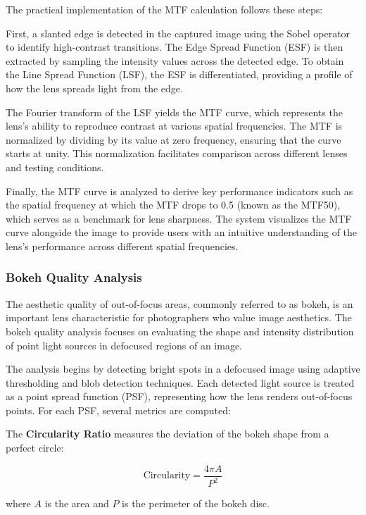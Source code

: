 The practical implementation of the MTF calculation follows these steps:

First, a slanted edge is detected in the captured image using the Sobel operator to identify high-contrast transitions. The Edge Spread Function (ESF) is then extracted by sampling the intensity values across the detected edge. To obtain the Line Spread Function (LSF), the ESF is differentiated, providing a profile of how the lens spreads light from the edge.

The Fourier transform of the LSF yields the MTF curve, which represents the lens's ability to reproduce contrast at various spatial frequencies. The MTF is normalized by dividing by its value at zero frequency, ensuring that the curve starts at unity. This normalization facilitates comparison across different lenses and testing conditions.

Finally, the MTF curve is analyzed to derive key performance indicators such as the spatial frequency at which the MTF drops to 0.5 (known as the MTF50), which serves as a benchmark for lens sharpness. The system visualizes the MTF curve alongside the image to provide users with an intuitive understanding of the lens's performance across different spatial frequencies.

\subsubsection{Bokeh Quality Analysis}
The aesthetic quality of out-of-focus areas, commonly referred to as bokeh, is an important lens characteristic for photographers who value image aesthetics. The bokeh quality analysis focuses on evaluating the shape and intensity distribution of point light sources in defocused regions of an image.

The analysis begins by detecting bright spots in a defocused image using adaptive thresholding and blob detection techniques. Each detected light source is treated as a point spread function (PSF), representing how the lens renders out-of-focus points. For each PSF, several metrics are computed:

The \textbf{Circularity Ratio} measures the deviation of the bokeh shape from a perfect circle:

\begin{equation}
\text{Circularity} = \frac{4\pi A}{P^2}
\end{equation}

where \( A \) is the area and \( P \) is the perimeter of the bokeh disc.


